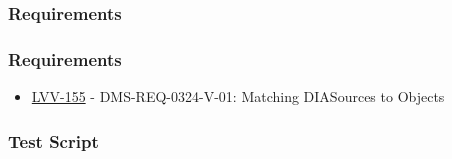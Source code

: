 \hypertarget{requirements-42}{%
\subsubsection{Requirements}\label{requirements-42}}

\hypertarget{requirements-43}{%
\subsubsection{Requirements}\label{requirements-43}}

\begin{itemize}
\tightlist
\item
  \href{https://jira.lsstcorp.org/browse/LVV-155}{LVV-155} -
  DMS-REQ-0324-V-01: Matching DIASources to Objects
\end{itemize}

\hypertarget{test-script-21}{%
\subsubsection{Test Script}\label{test-script-21}}

